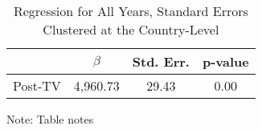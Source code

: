 \noindent 

\begin{table}[H]

\caption{Regression for All Years, Standard Errors Clustered at the Country-Level\label{tab:regression_cls}}

\medskip{}



\begin{centering}

\begin{tabular}{cccc}

\hline 

 & $\beta$ & Std. Err. & p-value\tabularnewline

\hline 

Post-TV & 4,960.73 & 29.43 & 0.00\tabularnewline

\hline 

\end{tabular}

\par\end{centering}

\begin{centering}

\medskip{}

\par\end{centering}

{\footnotesize{}Note: Table notes}{\footnotesize\par}

\end{table}